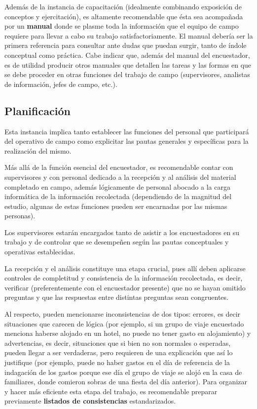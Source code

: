 \documentclass[
]{book}
\begin{document}
Además de la instancia de capacitación (idealmente combinando exposición de conceptos y ejercitación), es altamente recomendable que ésta sea acompañada por un \textbf{manual} donde se plasme toda la información que el equipo de campo requiere para llevar a cabo su trabajo satisfactoriamente. El manual debería ser la primera referencia para consultar ante dudas que puedan surgir, tanto de índole conceptual como práctica. Cabe indicar que, además del manual del encuestador, es de utilidad producir otros manuales que detallen las tareas y las formas en que se debe proceder en otras funciones del trabajo de campo (supervisores, analistas de información, jefes de campo, etc.).

\hypertarget{planificaciuxf3n}{%
\subsection{Planificación}\label{planificaciuxf3n}}

Esta instancia implica tanto establecer las funciones del personal que participará del operativo de campo como explicitar las pautas generales y específicas para la realización del mismo.

Más allá de la función esencial del encuestador, es recomendable contar con supervisores y con personal dedicado a la recepción y al análisis del material completado en campo, además lógicamente de personal abocado a la carga informática de la información recolectada (dependiendo de la magnitud del estudio, algunas de estas funciones pueden ser encarnadas por las mismas personas).

Los supervisores estarán encargados tanto de asistir a los encuestadores en su trabajo y de controlar que se desempeñen según las pautas conceptuales y operativas establecidas.

La recepción y el análisis constituye una etapa crucial, pues allí deben aplicarse controles de completitud y consistencia de la información recolectada, es decir, verificar (preferentemente con el encuestador presente) que no se hayan omitido preguntas y que las respuestas entre distintas preguntas sean congruentes.

Al respecto, pueden mencionarse inconsistencias de dos tipos: errores, es decir situaciones que carecen de lógica (por ejemplo, si un grupo de viaje encuestado menciona haberse alojado en un hotel, no puede no tener gasto en alojamiento) y advertencias, es decir, situaciones que si bien no son normales o esperadas, pueden llegar a ser verdaderas, pero requieren de una explicación que así lo justifique (por ejemplo, puede no haber gastos en el día de referencia de la indagación de los gastos porque ese día el grupo de viaje se alojó en la casa de familiares, donde comieron sobras de una fiesta del día anterior). Para organizar y hacer más eficiente esta etapa del trabajo, es recomendable preparar previamente \textbf{listados de consistencias} estandarizados.
\end{document}
